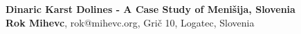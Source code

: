 \documentclass[a0,portrait]{a0poster}
\begin{document}


\begin{minipage}[b]{1\linewidth}
\veryHuge \color{Black} \textbf{Dinaric Karst Dolines - A Case Study of Menišija, Slovenia} \color{Black}\\ %
\centering
\Large \textbf{Rok Mihevc}, rok@mihevc.org, Grič 10, Logatec, Slovenia %
\end{minipage}
%
\vspace{1cm} %

\end{document}
